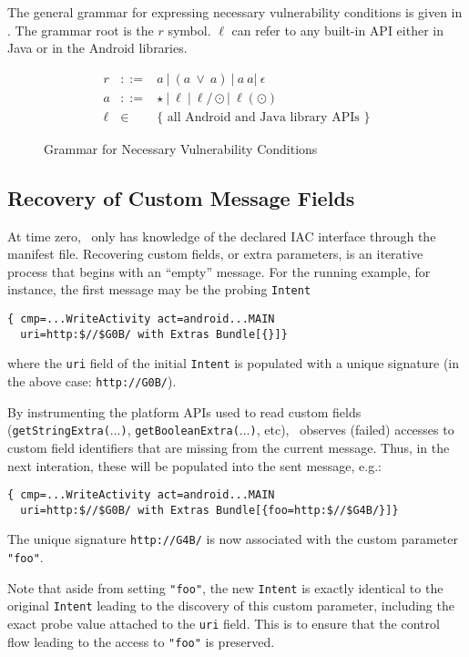 The general grammar for expressing necessary vulnerability conditions is given in . The grammar root is the $r$ symbol. $\ell$ can refer to any built-in API either in Java or in the Android libraries.

\begin{figure}
	$$
	\begin{array}{rcl}
		r & ::= &  a\ |\ (a\ \vee\ a)\ |\  a\ a |\ \epsilon  \\
		a & ::= & \star\ |\ \ell\ |\ \ell / \odot |\ \ell(\odot) \\
		\ell & \in & \text{$\{$ all Android and Java library APIs $\}$}
	\end{array}
	$$
\caption{\label{Fi:grammar}Grammar for Necessary Vulnerability Conditions}
\end{figure}

\subsection{Recovery of Custom Message Fields}\label{Se:customparams}

At time zero, \Tool\ only has knowledge of the declared IAC interface through the manifest file. Recovering custom fields, or extra parameters, is an iterative process that begins with an ``empty'' message. For the running example, for instance, the first message may be the probing {\tt Intent}
\begin{lstlisting}[numbers=none]
{ cmp=...WriteActivity act=android...MAIN 
  uri=http:$//$G0B/ with Extras Bundle[{}]}
\end{lstlisting}
where the {\tt uri} field of the initial {\tt Intent} is populated with a unique signature (in the above case: {\tt http://G0B/}).

By instrumenting the platform APIs used to read custom fields
({\tt getStringExtra($\ldots$)}, {\tt getBooleanExtra($\ldots$)}, etc), \Tool\ observes (failed) accesses to custom field identifiers that are missing from the current message. Thus, in the next interation, these will be populated into the sent message, e.g.:
\begin{lstlisting}[numbers=none]
{ cmp=...WriteActivity act=android...MAIN 
  uri=http:$//$G0B/ with Extras Bundle[{foo=http:$//$G4B/}]}
\end{lstlisting}
The unique signature {\tt http://G4B/} is now associated with the custom parameter {\tt "foo"}. 

Note that aside from setting {\tt "foo"}, the new {\tt Intent} is exactly identical to the original {\tt Intent} leading to the discovery of this custom parameter, including the exact probe value attached to the {\tt uri} field. This is to ensure that the control flow leading to the access to {\tt "foo"} is preserved.

